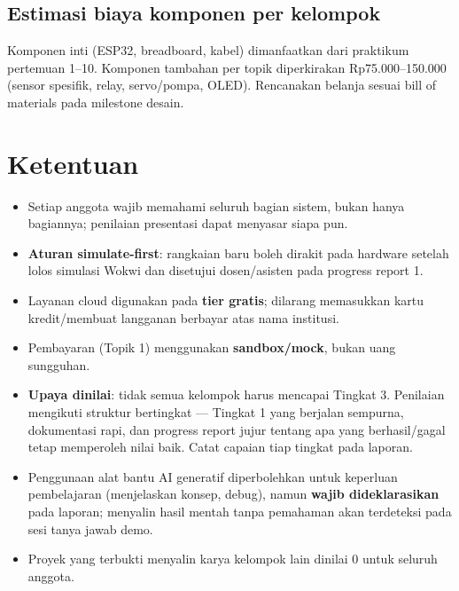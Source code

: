 \documentclass[11pt,a4paper]{article}
\begin{document}
\subsection*{Estimasi biaya komponen per kelompok}

Komponen inti (ESP32, breadboard, kabel) dimanfaatkan dari praktikum
pertemuan 1--10. Komponen tambahan per topik diperkirakan Rp75.000--150.000
(sensor spesifik, relay, servo/pompa, OLED). Rencanakan belanja sesuai bill
of materials pada milestone desain.

\section{Ketentuan}

\begin{itemize}
  \item Setiap anggota wajib memahami seluruh bagian sistem, bukan hanya
        bagiannya; penilaian presentasi dapat menyasar siapa pun.
  \item \textbf{Aturan simulate-first}: rangkaian baru boleh dirakit pada
        hardware setelah lolos simulasi Wokwi dan disetujui dosen/asisten
        pada progress report 1.
  \item Layanan cloud digunakan pada \textbf{tier gratis}; dilarang memasukkan
        kartu kredit/membuat langganan berbayar atas nama institusi.
  \item Pembayaran (Topik 1) menggunakan \textbf{sandbox/mock}, bukan uang
        sungguhan.
  \item \textbf{Upaya dinilai}: tidak semua kelompok harus mencapai Tingkat
        3. Penilaian mengikuti struktur bertingkat --- Tingkat 1 yang berjalan
        sempurna, dokumentasi rapi, dan progress report jujur tentang apa yang
        berhasil/gagal tetap memperoleh nilai baik. Catat capaian tiap tingkat
        pada laporan.
  \item Penggunaan alat bantu AI generatif diperbolehkan untuk keperluan
        pembelajaran (menjelaskan konsep, debug), namun \textbf{wajib
        dideklarasikan} pada laporan; menyalin hasil mentah tanpa pemahaman
        akan terdeteksi pada sesi tanya jawab demo.
  \item Proyek yang terbukti menyalin karya kelompok lain dinilai 0 untuk
        seluruh anggota.
\end{itemize}
\end{document}
